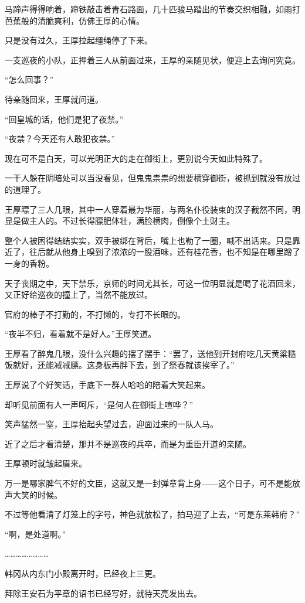 马蹄声得得响着，蹄铁敲击着青石路面，几十匹骏马踏出的节奏交织相融，如雨打芭蕉般的清脆爽利，仿佛王厚的心情。

只是没有过久，王厚拉起缰绳停了下来。

一支巡夜的小队，正押着三人从前面过来，王厚的亲随见状，便迎上去询问究竟。

“怎么回事？”

待亲随回来，王厚就问道。

“回皇城的话，他们是犯了夜禁。”

“夜禁？今天还有人敢犯夜禁。”

现在可不是白天，可以光明正大的走在御街上，更别说今天如此特殊了。

一干人躲在阴暗处可以当没看见，但鬼鬼祟祟的想要横穿御街，被抓到就没有放过的道理了。

王厚瞟了三人几眼，其中一人穿着最为华丽，与两名仆役装束的汉子截然不同，明显是做主人的。不过长得膘肥体壮，满脸横肉，倒像个土财主。

整个人被困得结结实实，双手被绑在背后，嘴上也勒了一圈，喊不出话来。只是靠近了，往后就从他身上嗅到了浓浓的一股酒味，还有桂花香，也不知是在哪里蹭了一身的香粉。

天子丧期之中，天下禁乐，京师的时间尤其长，可这一位明显就是喝了花酒回来，又正好给巡夜的撞上了，当然不能放过。

官府的棒子不打勤的，不打懒的，专打不长眼的。

“夜半不归，看着就不是好人。”王厚笑道。

王厚看了醉鬼几眼，没什么兴趣的摆了摆手：“罢了，送他到开封府吃几天黄粱糙饭就好，还能减减膘。这身板再胖下去，到了祭春就该挨宰了。”

王厚说了个好笑话，手底下一群人哈哈的陪着大笑起来。

却听见前面有人一声呵斥，“是何人在御街上喧哗？”

笑声猛然一窒，王厚抬起头望过去，迎面过来的一队人马。

近了之后才看清楚，那并不是巡夜的兵卒，而是为重臣开道的亲随。

王厚顿时就皱起眉来。

万一是哪家脾气不好的文臣，这就又是一封弹章背上身——这个日子，可不是能放声大笑的时候。

不过等他看清了灯笼上的字号，神色就放松了，拍马迎了上去，“可是东莱韩府？”

“啊，是处道啊。”

……………………

韩冈从内东门小殿离开时，已经夜上三更。

拜除王安石为平章的诏书已经写好，就待天亮发出去。

